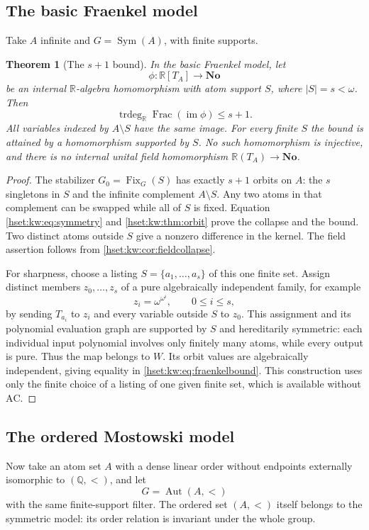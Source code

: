 \documentclass[11pt,letterpaper]{article}
\newtheorem{theorem}{Theorem}[section]
\theoremstyle{definition}
\theoremstyle{remark}
\newcommand{\No}{\mathbf{No}}
\newcommand{\Aut}{\operatorname{Aut}}
\newcommand{\AC}{\mathrm{AC}}
\newcommand{\R}{\mathbb R}
\newcommand{\Q}{\mathbb Q}
\newcommand{\Frac}{\operatorname{Frac}}
\newcommand{\trdeg}{\operatorname{trdeg}}
\newcommand{\Fix}{\operatorname{Fix}}
\newcommand{\Sym}{\operatorname{Sym}}
\newcommand{\im}{\operatorname{im}}
\begin{document}
\subsection{The basic Fraenkel model}
Take $A$ infinite and $G=\Sym(A)$, with finite supports.

\begin{theorem}[The $s+1$ bound]\label{hset:kw:thm:fraenkel}
In the basic Fraenkel model, let
\[
\phi:\R[T_A]\longrightarrow\No
\]
be an internal $\R$-algebra homomorphism with atom support $S$, where $|S|=s<\omega$. Then
\begin{equation}\label{hset:kw:eq:fraenkelbound}
\trdeg_\R\Frac(\im\phi)\le s+1.
\end{equation}
All variables indexed by $A\setminus S$ have the same image. For every finite $S$ the bound is attained by a homomorphism supported by $S$. No such homomorphism is injective, and there is no internal unital field homomorphism $\R(T_A)\to\No$.
\end{theorem}
\begin{proof}
The stabilizer $G_0=\Fix_G(S)$ has exactly $s+1$ orbits on $A$: the $s$ singletons in $S$ and the infinite complement $A\setminus S$. Any two atoms in that complement can be swapped while all of $S$ is fixed. Equation \eqref{hset:kw:eq:symmetry} and \cref{hset:kw:thm:orbit} prove the collapse and the bound. Two distinct atoms outside $S$ give a nonzero difference in the kernel. The field assertion follows from \cref{hset:kw:cor:fieldcollapse}.

For sharpness, choose a listing $S=\{a_1,\ldots,a_s\}$ of this one finite set. Assign distinct members $z_0,\ldots,z_s$ of a pure algebraically independent family, for example
\[
z_i=\omega^{\omega^i},\qquad 0\le i\le s,
\]
by sending $T_{a_i}$ to $z_i$ and every variable outside $S$ to $z_0$. This assignment and its polynomial evaluation graph are supported by $S$ and hereditarily symmetric: each individual input polynomial involves only finitely many atoms, while every output is pure. Thus the map belongs to $W$. Its orbit values are algebraically independent, giving equality in \eqref{hset:kw:eq:fraenkelbound}. This construction uses only the finite choice of a listing of one given finite set, which is available without $\AC$.
\end{proof}

\subsection{The ordered Mostowski model}
Now take an atom set $A$ with a dense linear order without endpoints externally isomorphic to $(\Q,<)$, and let
\[
G=\Aut(A,<)
\]
with the same finite-support filter. The ordered set $(A,<)$ itself belongs to the symmetric model: its order relation is invariant under the whole group.
\end{document}
